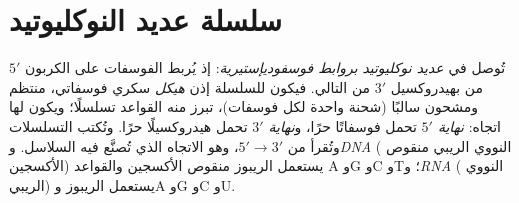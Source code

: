 \section{سلسلة عديد النوكليوتيد}

\begin{definition}\label{def:b1:nucleic-acids:chain}
تُوصل  في \emph{عديد نوكليوتيد}
\emph{بروابط فوسفوديإستيرية}: إذ يُربط
الفوسفات على الكربون $5'$ من  بهيدروكسيل $3'$ من التالي.
فيكون للسلسلة إذن \emph{هيكل} سكري فوسفاتي، منتظم ومشحون سالبًا
(شحنة واحدة لكل فوسفات)، تبرز منه القواعد تسلسلًا؛ ويكون لها اتجاه:
\emph{نهاية $5'$} تحمل فوسفاتًا حرًا،
و\emph{نهاية $3'$} تحمل هيدروكسيلًا حرًا.
وتُكتب التسلسلات وتُقرأ من $5' \to 3'$، وهو الاتجاه الذي تُصنَّع فيه
السلاسل. و\emph{DNA} ( النووي الريبي منقوص الأكسجين)
يستعمل الريبوز منقوص الأكسجين والقواعد A وG وC وT؛
و\emph{RNA} ( النووي الريبي) يستعمل الريبوز وA وG وC
وU.
\end{definition}

